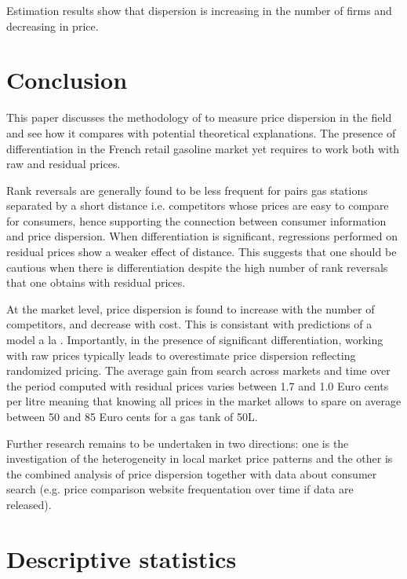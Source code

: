 \documentclass[english]{article}
\begin{document}
Estimation results show that dispersion is increasing in the number of firms and decreasing in price.

\section{Conclusion}

This paper discusses the methodology of \cite{TAP11} to measure price dispersion in the field and see how it compares with potential theoretical explanations. The presence of differentiation in the French retail gasoline market yet requires to work both with raw and residual prices.

Rank reversals are generally found to be less frequent for pairs gas stations separated by a short distance i.e. competitors whose prices are easy to compare for consumers, hence supporting the connection between consumer information and price dispersion. When differentiation is significant, regressions performed on residual prices show a weaker effect of distance. This suggests that one should be cautious when there is differentiation despite the high number of rank reversals that one obtains with residual prices.

At the market level, price dispersion is found to increase with the number of competitors, and decrease with cost. This is consistant with predictions of a model a la \cite{VAR80}. Importantly, in the presence of significant differentiation, working with raw prices typically leads to overestimate price dispersion reflecting randomized pricing. The average gain from search across markets and time over the period computed with residual prices varies between 1.7 and 1.0 Euro cents per litre meaning that knowing all prices in the market allows to spare on average between 50 and 85 Euro cents for a gas tank of 50L.

Further research remains to be undertaken in two directions: one is the investigation of the heterogeneity in local market price patterns and the other is the combined analysis of price dispersion together with data about consumer search (e.g. price comparison website frequentation over time if data are released).

\newpage



\newpage

\appendix

\section{Descriptive statistics}
\end{document}
